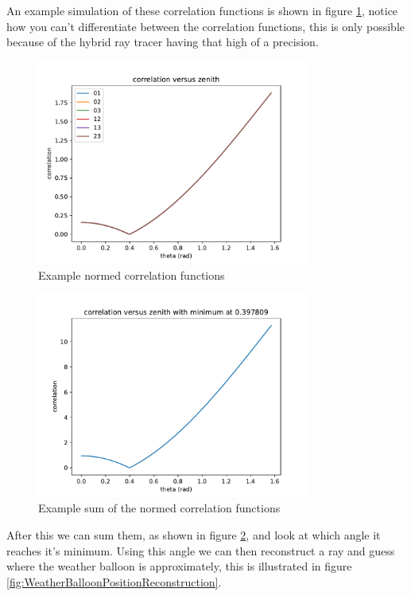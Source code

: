 \documentclass[11pt,a4paper,faculty=we,language=en,doctype=report]{cls/ugent-doc}
\begin{document}
An example simulation of these correlation functions is shown in figure \ref{fig:NormedCorrelation}, 
notice how you can't differentiate between the correlation functions, this is only possible
because of the hybrid ray tracer having that high of a precision.
\begin{figure}
	\centering
	\includegraphics[width=0.8\textwidth]{NormedCorrelation.pdf}
	\caption{Example normed correlation functions}
	\label{fig:NormedCorrelation}
\end{figure}
\begin{figure}
	\centering
	\includegraphics[width=0.8\textwidth]{SummedCorrelation.pdf}
	\caption{Example sum of the normed correlation functions}
	\label{fig:SummedCorrelation}
\end{figure}
After this we can sum them, as shown in figure \ref{fig:SummedCorrelation}, and look
at which angle it reaches it's minimum. Using this angle we can then reconstruct a ray and guess 
where the weather balloon is approximately, this is illustrated in figure 
\ref{fig:WeatherBalloonPositionReconstruction}. 
\end{document}
